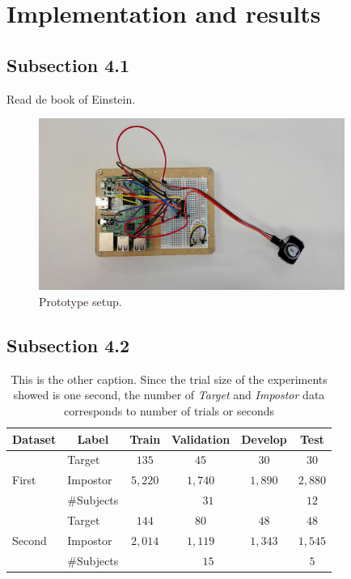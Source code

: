 \clearpage
\section{Implementation and results}
\label{sec:sect4}
\lipsum[8]
\subsection{Subsection 4.1}
\label{subsec:subsec4.1}
\lipsum[8]
Read de book \cite{einstein} of Einstein.

\begin{figure}[H]
\label{fig:prototype1}
\centering
\includegraphics[width=10cm]{img/Chapter4/prototype1_edited.jpg}
\caption[Prototype setup]{\footnotesize{Prototype setup.}}
\end{figure}

\lipsum[14]

\subsection{Subsection 4.2}
\label{subsec:subsec4.2}

\begin{table}[H]
\centering
\caption[This is the caption]{ \footnotesize This is the other caption. Since the trial size of the experiments showed is one second, the number of \textit{Target} and \textit{Impostor} data corresponds to number of trials or seconds}
\label{tab:data_partition}
\footnotesize{
\begin{tabular}{@{}llcccc@{}}
\toprule
\textbf{Dataset}         & \multicolumn{1}{c}{\textbf{Label}} & \textbf{Train} & \textbf{Validation} & \textbf{Develop} & \textbf{Test} \\ \midrule
\midrule
\multirow{3}{*}{First} & Target   & $135$ & $45$  & $30$  & $30$  \\
                         & Impostor & $5,220$    & $1,740$ & $1,890$   & $2,880$    \\
\cmidrule(lr){3-5} \cmidrule(l){6-6}
                         & \#Subjects          & \multicolumn{3}{c}{$31$} & $12$ \\
\midrule
\multirow{3}{*}{Second}  & Target   & $144$ & $80$  & $48$  & $48$  \\
                         & Impostor & $2,014$    & $1,119$    & $1,343$    & $1,545$ \\
\cmidrule(lr){3-5} \cmidrule(l){6-6}
                         & \#Subjects   & \multicolumn{3}{c}{$15$} & $5$ \\ 
\bottomrule
\end{tabular}
}
\end{table}
